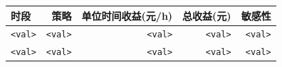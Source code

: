 \begin{tabular}{lrrrr}
\toprule
\textbf{时段} & \textbf{策略} & \textbf{单位时间收益(元/h)} & \textbf{总收益(元)} & \textbf{敏感性} \\\midrule
\texttt{<val>} & \texttt{<val>} & \texttt{<val>} & \texttt{<val>} & \texttt{<val>} \\
\texttt{<val>} & \texttt{<val>} & \texttt{<val>} & \texttt{<val>} & \texttt{<val>} \\\bottomrule
\end{tabular}
